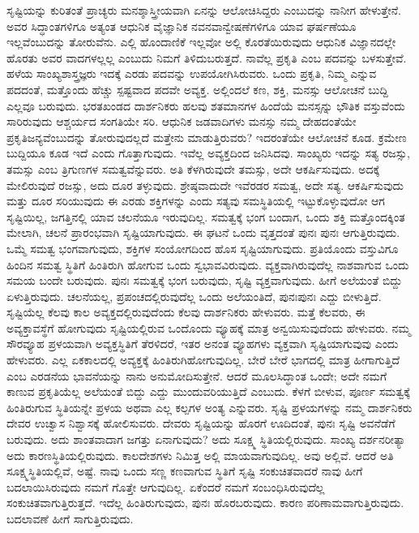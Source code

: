 ಸೃಷ್ಟಿಯನ್ನು ಕುರಿತಂತೆ ಪ್ರಾಚ್ಯರು ಮನಶ್ಶಾಸ್ತ್ರೀಯವಾಗಿ ಏನನ್ನು ಆಲೋಚಿಸಿದ್ದರು ಎಂಬುದನ್ನು ನಾನೀಗ ಹೇಳುತ್ತೇನೆ. ಅವರ ಸಿದ್ಧಾಂತಗಳಿಗೂ ಅತ್ಯಂತ ಆಧುನಿಕ ವೈಜ್ಞಾನಿಕ ನವನವಾನ್ವೇಷಣೆಗಳಿಗೂ ಯಾವ ಘರ್ಷಣೆಯೂ ಇಲ್ಲವೆಂಬುದನ್ನು ತೋರುವೆನು. ಎಲ್ಲಿ ಹೊಂದಾಣಿಕೆ ಇಲ್ಲವೋ ಅಲ್ಲಿ ಕೊರತೆಯಿರುವುದು ಆಧುನಿಕ ವಿಜ್ಞಾನದಲ್ಲೇ ಹೊರತು ಅವರ ವಾದಗಳಲ್ಲಲ್ಲ ಎಂಬುದು ನಿಮಗೆ ತಿಳಿದುಬರುತ್ತದೆ. ನಾವೆಲ್ಲ ಪ್ರಕೃತಿ ಎಂಬ ಪದವನ್ನು ಬಳಸುತ್ತೇವೆ. ಹಳೆಯ ಸಾಂಖ್ಯಶಾಸ್ತ್ರಜ್ಞರು ಇದಕ್ಕೆ ಎರಡು ಪದವನ್ನು ಉಪಯೋಗಿಸಿರುವರು. ಒಂದು ಪ್ರಕೃತಿ, ನಿಮ್ಮ  ಎನ್ನುವ ಪದದಂತೆ, ಮತ್ತೊಂದು ಹೆಚ್ಚು ಸ್ಪಷ್ಟವಾದ ಪದವೇ ಅವ್ಯಕ್ತ. ಅಲ್ಲಿಂದಲೆ ಕಣ, ಶಕ್ತಿ, ಮನಸ್ಸು ಆಲೋಚನೆ ಬುದ್ದಿ ಎಲ್ಲವೂ ಬರುವುದು. ಭರತಖಂಡದ ದಾರ್ಶನಿಕರು ಹಲವು ಶತಮಾನಗಳ ಹಿಂದೆಯೆ ಮನಸ್ಸನ್ನು ಭೌತಿಕ ವಸ್ತುವೆಂದು ಸಾರಿರುವುದು ಆಶ್ಚರ್ಯದ ಸಂಗತಿಯೇ ಸರಿ. ಆಧುನಿಕ ಜಡವಾದಿಗಳು ಮನಸ್ಸು ನಮ್ಮ ದೇಹದಂತೆಯೇ ಪ್ರಕೃತಿಜನ್ಯವೆಂಬುದನ್ನು ತೋರುವುದಲ್ಲದೆ ಮತ್ತೇನು ಮಾಡುತ್ತಿರುವರು? ಇದರಂತೆಯೇ ಆಲೋಚನೆ ಕೂಡ. ಕ್ರಮೇಣ ಬುದ್ದಿಯೂ ಕೂಡ ಇದೆ ಎಂದು ಗೊತ್ತಾಗುವುದು. ಇವೆಲ್ಲ ಅವ್ಯಕ್ತದಿಂದ ಜನಿಸಿದವು. ಸಾಂಖ್ಯರು ಇದನ್ನು ಸತ್ಯ ರಜಸ್ಸು, ತಮಸ್ಸು ಎಂಬ ತ್ರಿಗುಣಗಳ ಸಮತ್ವವೆನ್ನುವರು. ಅತಿ ಕೆಳಗಿರುವುದೇ ತಮಸ್ಸು, ಅದೇ ಆಕರ್ಷಿಸುವುದು. ಅದಕ್ಕೆ ಮೇಲಿರುವುದೆ ರಜಸ್ಸು, ಅದು ದೂರ ತಳ್ಳುವುದು. ಶ್ರೇಷ್ಠವಾದುದೇ ಇವೆರಡರ ಸಮತ್ವ, ಅದೇ ಸತ್ಯ. ಆಕರ್ಷಿಸುವುದು ಮತ್ತು ದೂರ ಸರಿಯುವುದು ಈ ಎರಡು ಶಕ್ತಿಗಳನ್ನು ಎಂದು ಸತ್ಯವು ಸಮಸ್ಥಿತಿಯಲ್ಲಿ ಇಟ್ಟುಕೊಳ್ಳುವುದೋ ಆಗ ಸೃಷ್ಟಿಯಿಲ್ಲ, ಜಗತ್ತಿನಲ್ಲಿ ಯಾವ ಚಲನೆಯೂ ಇರುವುದಿಲ್ಲ. ಸಮತ್ವಕ್ಕೆ ಭಂಗ ಬಂದಾಗ, ಒಂದು ಶಕ್ತಿ ಮತ್ತೊಂದಕ್ಕಿಂತ ಮೇಲಾಗಿ, ಚಲನೆ ಪ್ರಾರಂಭವಾಗಿ ಸೃಷ್ಟಿಯಾಗುವುದು. ಈ ಘಟನೆ ಒಂದು ವೃತ್ತದಂತೆ ಪುನಃ ಪುನಃ ಆಗುತ್ತಿರುವುದು. ಒಮ್ಮೆ ಸಮತ್ವ ಭಂಗವಾಗುವುದು, ಶಕ್ತಿಗಳ ಸಂಯೋಗದಿಂದ ಹೊಸ ಸೃಷ್ಟಿಯಾಗುವುದು. ಪ್ರತಿಯೊಂದು ವಸ್ತುವಿಗೂ ಹಿಂದಿನ ಸಮತ್ವ ಸ್ಥಿತಿಗೆ ಹಿಂತಿರುಗಿ ಹೋಗುವ ಒಂದು ಸ್ವಭಾವವಿರುವುದು. ವ್ಯಕ್ತವಾಗಿರುವುದೆಲ್ಲ ನಾಶವಾಗುವ ಒಂದು ಸಮಯ ಬಂದೇ ಬರುವುದು. ಪುನಃ ಸಮತ್ವಕ್ಕೆ ಭಂಗ ಬರುವುದು, ಸೃಷ್ಟಿ ವ್ಯಕ್ತವಾಗುವುದು. ಹೀಗೆ ಅಲೆಯಂತೆ ಬಿದ್ದು ಏಳುತ್ತಿರುವುದು. ಚಲನೆಯಲ್ಲ, ಪ್ರಪಂಚದಲ್ಲಿರುವುದೆಲ್ಲ ಒಂದು ಅಲೆಯಂತಿದೆ, ಪುನಃಪುನಃ ಎದ್ದು ಬೀಳುತ್ತಿದೆ. ಸೃಷ್ಟಿಯೆಲ್ಲ ಕೆಲವು ಕಾಲ ಅವ್ಯಕ್ತದಲ್ಲಿರುವುದೆಂದು ಕೆಲವು ದಾರ್ಶನಿಕರು ಹೇಳುವರು. ಮತ್ತೆ ಕೆಲವರು, ಈ ಅವ್ಯಕ್ತಾವಸ್ಥೆಗೆ ಹೋಗುವುದು ಸೃಷ್ಟಿಯಲ್ಲಿರುವ ಒಂದೊಂದು ವ್ಯೂಹಕ್ಕೆ ಮಾತ್ರ ಅನ್ವಯಿಸುವುದೆಂದು ಹೇಳುವರು. ನಮ್ಮ ಸೌರವ್ಯೂಹ ಪ್ರಳಯವಾಗಿ ಅವ್ಯಕ್ತಸ್ಥಿತಿಗೆ ತೆರಳಿದರೆ, ಇತರ ಅನಂತ ವ್ಯೂಹಗಳು ವ್ಯಕ್ತವಾಗಿ ಸೃಷ್ಟಿಯಾಗುವುವು ಎಂದು ಹೇಳುವರು. ಎಲ್ಲ ಏಕಕಾಲದಲ್ಲಿ ಅವ್ಯಕ್ತಕ್ಕೆ ಹಿಂತಿರುಗಿ\break ಹೋಗುವುದಿಲ್ಲ. ಬೇರೆ ಬೇರೆ ಭಾಗದಲ್ಲಿ ಮಾತ್ರ ಹೀಗಾಗುತ್ತಿದೆ ಎಂಬ ಎರಡನೆಯ ಭಾವನೆಯನ್ನು ನಾನು ಅನುಮೋದಿಸುತ್ತೇನೆ. ಆದರೆ ಮೂಲಸಿದ್ಧಾಂತ ಒಂದೇ; ಅದೇ ನಮಗೆ ಕಾಣುವ ಪ್ರಕೃತಿಯೆಲ್ಲ ಅಲೆಯಂತೆ ಬಿದ್ದು ಎದ್ದು ಮುಂದುವರಿಯುತ್ತಿದೆ ಎಂಬುದು. ಕೆಳಗೆ ಬೀಳುವ, ಪೂರ್ಣ ಸಮತ್ವಕ್ಕೆ ಹಿಂತಿರುಗುವ ಸ್ಥಿತಿಯನ್ನೇ ಪ್ರಳಯ ಅಥವಾ ಎಲ್ಲ ಕಲ್ಪಗಳ ಅಂತ್ಯ ಎನ್ನುವರು. ಸೃಷ್ಟಿ ಪ್ರಳಯಗಳನ್ನು ನಮ್ಮ ದಾರ್ಶನಿಕರು ದೇವರ ಉಚ್ವಾಸ ನಿಶ್ವಾಸಕ್ಕೆ ಹೋಲಿಸುವರು. ದೇವರು ಸೃಷ್ಟಿಯನ್ನು ಹೊರಗೆ ಊದಿದಂತೆ, ಪುನಃ ಸೃಷ್ಟಿ ಅವನೆಡೆಗೆ ಬರುವುದು. ಅದು ಶಾಂತವಾದಾಗ ಜಗತ್ತು ಏನಾಗುವುದು? ಅದು ಸೂಕ್ಷ್ಮ ಸ್ಥಿತಿಯಲ್ಲಿರುವುದು. ಸಾಂಖ್ಯ ದರ್ಶನರೀತ್ಯಾ ಅದು ಕಾರಣಸ್ಥಿತಿಯಲ್ಲಿರುವುದು. ಕಾಲದೇಶಗಳು ನಿಮಿತ್ತ ಅಲ್ಲಿ ಮಾಯವಾಗುವುದಿಲ್ಲ. ಅವು ಅಲ್ಲಿವೆ. ಆದರೆ ಅತಿ ಸೂಕ್ಷ್ಮಸ್ಥಿತಿಯಲ್ಲಿವೆ, ಅಷ್ಟೆ. ನಾವು ಒಂದು ಸಣ್ಣ ಕಣವಾಗುವ ಸ್ಥಿತಿಗೆ ಸೃಷ್ಟಿ ಸಂಕುಚಿತವಾದರೆ ನಾವು ಹೀಗೆ ಬದಲಾಯಿಸಿರುವುದು ನಮಗೆ ಗೊತ್ತೇ ಆಗುವುದಿಲ್ಲ. ಏಕೆಂದರೆ ನಮಗೆ ಸಂಬಂಧಿಸಿರುವುದೆಲ್ಲ ಸಂಕುಚಿತವಾಗುತ್ತಿರುತ್ತದೆ. ಇದೆಲ್ಲ ಹಿಂತಿರುಗುವುದು, ಪುನಃ ಹೊರಬರುವುದು. ಕಾರಣ ಪರಿಣಾಮವಾಗುತ್ತಿರುವುದು. ಬದಲಾವಣೆ ಹೀಗೆ ಸಾಗುತ್ತಿರುವುದು.

